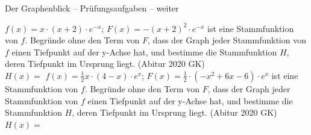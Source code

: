 \begin{aufgabe}{Der Graphenblick – Prüfungsaufgaben – weiter}
\begin{teile}
\teil $f(x) = x \cdot (x + 2) \cdot e^{-x}$; $F(x) = -(x + 2)^2 \cdot e^{-x}$ ist eine Stammfunktion von $f$. Begründe ohne den Term von $F$, dass der Graph jeder Stammfunktion von $f$ einen Tiefpunkt auf der y-Achse hat, und bestimme die Stammfunktion $H$, deren Tiefpunkt im Ursprung liegt. \hfill (Abitur 2020 GK) \\ $H(x) = $ \leerfeld
\teil $f(x) = \frac{1}{2}x \cdot (4 - x) \cdot e^{x}$; $F(x) = \frac{1}{2} \cdot (-x^2 + 6x - 6) \cdot e^{x}$ ist eine Stammfunktion von $f$. Begründe ohne den Term von $F$, dass der Graph jeder Stammfunktion von $f$ einen Tiefpunkt auf der y-Achse hat, und bestimme die Stammfunktion $H$, deren Tiefpunkt im Ursprung liegt. \hfill (Abitur 2020 GK) \\ $H(x) = $ \leerfeld
\end{teile}
\end{aufgabe}

